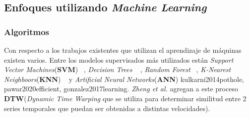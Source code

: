 	\subsection{Enfoques utilizando \emph{Machine Learning}}
		\subsubsection{Algoritmos}
			Con respecto a los trabajos existentes que utilizan el aprendizaje de máquinas existen varios. Entre los modelos supervisados
			más utilizados están \emph{Support Vector Machines}(\textbf{SVM}) ~, \emph{Decision Trees} ~ , \emph{Random Forest} ~, \emph{K-Nearest Neighboors}(\textbf{KNN})
			~ y \emph{Artificial Neural Networks}(\textbf{ANN}) \brackcite
			{kulkarni2014pothole, pawar2020efficient, gonzalez2017learning}. \emph{Zheng et al.}  agregan a este proceso
			\textbf{DTW}(\emph{Dynamic Time Warping} que se utiliza para determinar similitud entre 2 series temporales que puedan ser obtenidas
			a distintas velocidades). 

